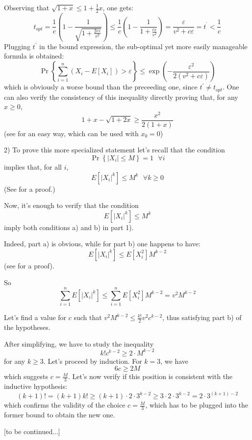 \documentclass[12pt]{article}
\begin{document}
Observing that $\sqrt{1+x}\leq 1+\frac{1}{2}x$, one gets:
\[
t_{opt}=\frac{1}{c}\left( 1-\frac{1}{\sqrt{1+\frac{2c\varepsilon }{v^2}}}
\right) \leq \frac{1}{c}\left( 1-\frac{1}{1+\frac{c\varepsilon }{v^2}}\right) =%
\frac{\varepsilon }{v^2+c\varepsilon }=t^{^{\prime }}<\frac{1}{c}
\]
Plugging $t^{\prime }$ in the bound expression, the sub-optimal yet more
easily manageable formula is obtained:
\[
\Pr\left\{ \sum_{i=1}^{n}\left( X_{i}-E[X_{i}]\right) >\varepsilon \right\}
\leq \exp \left( -\frac{\varepsilon ^{2}}{2\left( v^2+c\varepsilon \right) }%
\right) 
\]
which is obviously a worse bound than the preceeding one, since $t^{\prime
}\neq t_{opt}$. One can also verify the consistency of this inequality
directly proving that, for any $x\geq 0$, 
\[
1+x-\sqrt{1+2x}\geq \frac{x^{2}}{2\left( 1+x\right) }
\]
(see  for an easy way, which can be used with $x_0=0$)

2) To prove this more specialized statement let's recall that the condition
\[
\Pr\left\{ \left\vert X_{i}\right\vert \leq M\right\} =1\text{ \ }\forall i
\]
implies that, for all $i$,
\[
E[\left\vert X_{i}\right\vert ^{k}]\leq M^{k} \text{ \ }\forall k\geq 0
\]
(See  for a proof.)

Now, it's enough to verify that the condition
\[
E[\left\vert X_{i}\right\vert ^{k}]\leq M^{k} 
\]
imply both conditions a) and b) in part 1).

Indeed, part a) is obvious, while for part b) one happens to have:
\[
E[\left\vert X_{i}\right\vert ^{k}]\leq E\left[X_{i}^{2}\right] M^{k-2}
\]
(see  for a proof).

So
\[
\sum_{i=1}^{n}E[\left\vert X_{i}\right\vert ^{k}]\leq \sum_{i=1}^{n}E\left[
X_{i}^{2}\right] M^{k-2}=v^2M^{k-2}
\]

Let's find a value for $c$ such that $v^2M^{k-2}\leq \frac{k!}{2}v^2c^{k-2}$,
thus satisfying part b) of the hypotheses.

After simplifying, we have to study the inequality%
\[
k!c^{k-2}\geq 2\cdot M^{k-2}
\]
for any $k\geq 3$. Let's proceed by induction. For $k=3$, we have%
\[
6c\geq 2M
\]
which suggests $c=\frac{M}{3}$. Let's now verify if this position is
consistent with the inductive hypothesis:%
\[
\left( k+1\right) !=\left( k+1\right) k!\geq \left( k+1\right) \cdot 2\cdot
3^{k-2}\geq 3\cdot 2\cdot 3^{k-2}=2\cdot 3^{(k+1)-2}
\]
which confirms the validity of the choice $c=\frac{M}{3}$, which has to be
plugged into the former bound to obtain the new one.

[to be continued...]
\end{document}
